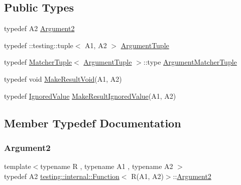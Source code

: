 \subsection*{Public Types}
\begin{DoxyCompactItemize}
\item 
typedef A2 \mbox{\hyperlink{structtesting_1_1internal_1_1_function_3_01_r_07_a1_00_01_a2_08_4_a025f5192252366d73aa19718bb0ea89d}{Argument2}}
\item 
typedef \+::testing\+::tuple$<$ A1, A2 $>$ \mbox{\hyperlink{structtesting_1_1internal_1_1_function_3_01_r_07_a1_00_01_a2_08_4_a2de00437877c29ec6cb78396928b8e3e}{Argument\+Tuple}}
\item 
typedef \mbox{\hyperlink{structtesting_1_1internal_1_1_matcher_tuple}{Matcher\+Tuple}}$<$ \mbox{\hyperlink{structtesting_1_1internal_1_1_function_3_01_r_07_08_4_ad483c3128c470d8cdb55c3ac1c575c11}{Argument\+Tuple}} $>$\+::type \mbox{\hyperlink{structtesting_1_1internal_1_1_function_3_01_r_07_a1_00_01_a2_08_4_ad07042129ff6370f55a279ad12f5e80f}{Argument\+Matcher\+Tuple}}
\item 
typedef void \mbox{\hyperlink{structtesting_1_1internal_1_1_function_3_01_r_07_a1_00_01_a2_08_4_ada1ad22fa21c84ec3faea47ed20c1b46}{Make\+Result\+Void}}(A1, A2)
\item 
typedef \mbox{\hyperlink{classtesting_1_1internal_1_1_ignored_value}{Ignored\+Value}} \mbox{\hyperlink{structtesting_1_1internal_1_1_function_3_01_r_07_a1_00_01_a2_08_4_a89033ea870fe831b13899ce36666e102}{Make\+Result\+Ignored\+Value}}(A1, A2)
\end{DoxyCompactItemize}


\subsection{Member Typedef Documentation}
\mbox{\label{structtesting_1_1internal_1_1_function_3_01_r_07_a1_00_01_a2_08_4_a025f5192252366d73aa19718bb0ea89d}} 
\subsubsection{\texorpdfstring{Argument2}{Argument2}}
{\footnotesize\ttfamily template$<$typename R , typename A1 , typename A2 $>$ \\
typedef A2 \mbox{\hyperlink{structtesting_1_1internal_1_1_function}{testing\+::internal\+::\+Function}}$<$ R(A1, A2)$>$\+::\mbox{\hyperlink{structtesting_1_1internal_1_1_function_3_01_r_07_a1_00_01_a2_08_4_a025f5192252366d73aa19718bb0ea89d}{Argument2}}}


